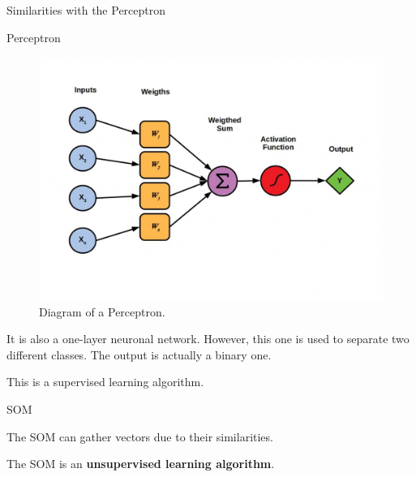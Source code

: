 \documentclass{beamer}
\begin{document}
		
	\begin{frame}{Similarities with the Perceptron}
	
		\begin{block}{Perceptron}

			\begin{center}
				
				\begin{figure}[h]

					\includegraphics[width=0.4\linewidth]{pics/Perceptrons-1024x724.jpeg}
					\caption{Diagram of a Perceptron.}	
				\end{figure}
			\end{center}

			It is also a one-layer neuronal network. However, this one is used to separate two different classes. The output is actually a binary one. 

			This is a supervised learning algorithm.
		\end{block}

		
		\begin{block}{SOM}
		
			The SOM can gather vectors due to their similarities.

			The SOM is an \textbf{unsupervised learning algorithm}.
		\end{block}



	\end{frame}
	
\end{document}
